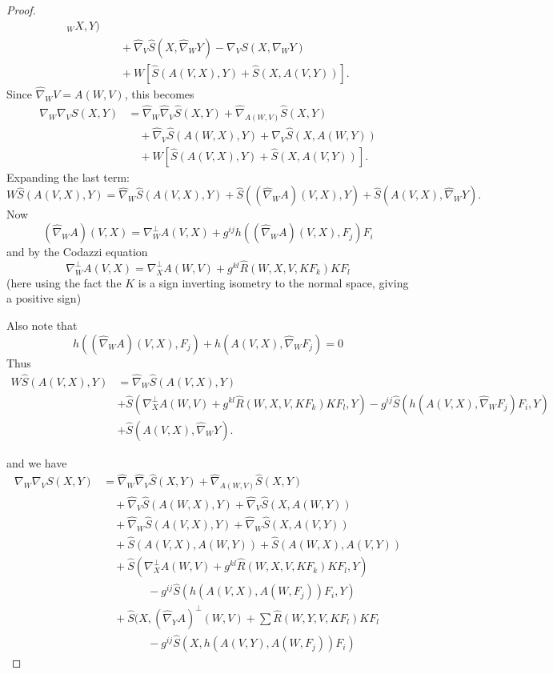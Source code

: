 \documentclass[12pt,letterpaper]{amsart}%
\numberwithin{mycounter}{section}
\theoremstyle{plain}
\numberwithin{equation}{section}
\theoremstyle{definition}
\begin{document}
\begin{proof}
\begin{align*}
_{W}X,Y)\\
&  \quad+\hat{\nabla}_{V}\hat{S}(X,\hat{\nabla}_{W}Y)-\nabla_{V}S(X,\nabla
_{W}Y)\\
&  \quad+W\left[  \hat{S}(A(V,X),Y)+\hat{S}(X,A(V,Y))\right]  .
\end{align*}
Since $\hat{\nabla}_{W}V=A(W,V)$, this becomes
\begin{align*}
\nabla_{W}\nabla_{V}S(X,Y) &  =\hat{\nabla}_{W}\hat{\nabla}_{V}\hat
{S}(X,Y)+\hat{\nabla}_{A(W,V)}\hat{S}(X,Y)\\
&  \quad+\hat{\nabla}_{V}\hat{S}(A(W,X),Y)+\hat{\nabla}_{V}\hat{S}(X,A(W,Y))\\
&  \quad+W\left[  \hat{S}(A(V,X),Y)+\hat{S}(X,A(V,Y))\right]  .
\end{align*}
Expanding the last term:
\[
W\hat{S}(A(V,X),Y)=\hat{\nabla}_{W}\hat{S}(A(V,X),Y)+\hat{S}\left(  \left(
\hat{\nabla}_{W}A\right)  (V,X),Y\right)  +\hat{S}(A(V,X),\hat{\nabla}_{W}Y).
\]
Now
\[
\left(  \hat{\nabla}_{W}A\right)  (V,X)=\nabla_{W}^{\perp}A(V,X)+g^{ij}%
h\left(  (\hat{\nabla}_{W}A)(V,X),F_{j}\right)  F_{i}%
\]
and by the Codazzi equation
\[
\nabla_{W}^{\perp}A(V,X)=\nabla_{X}^{\perp}A(W,V)+g^{kl}\hat{R}(W,X,V,KF_{k}%
)KF_{l}%
\]
(here using the fact the $K$ is a sign inverting isometry to the normal space,
giving a positive sign)\ 

Also note that
\[
h\left(  (\hat{\nabla}_{W}A)(V,X),F_{j}\right)  +h\left(  A(V,X),\hat{\nabla
}_{W}F_{j}\right)  =0
\]
Thus
\begin{align*}
W\hat{S}(A(V,X),Y)  & =\hat{\nabla}_{W}\hat{S}(A(V,X),Y)\\
& +\hat{S}\left(  \nabla_{X}^{\perp}A(W,V)+g^{kl}\hat{R}(W,X,V,KF_{k}%
)KF_{l},Y\right)  -g^{ij}\hat{S}\left(  h\left(  A(V,X),\hat{\nabla}_{W}%
F_{j}\right)  F_{i},Y\right)  \\
& +\hat{S}(A(V,X),\hat{\nabla}_{W}Y).
\end{align*}


and we have
\begin{align*}
\nabla_{W}\nabla_{V}S(X,Y) &  =\hat{\nabla}_{W}\hat{\nabla}_{V}\hat
{S}(X,Y)+\hat{\nabla}_{A(W,V)}\hat{S}(X,Y)\\
&  \quad+\hat{\nabla}_{V}\hat{S}(A(W,X),Y)+\hat{\nabla}_{V}\hat{S}(X,A(W,Y))\\
&  \quad+\hat{\nabla}_{W}\hat{S}(A(V,X),Y)+\hat{\nabla}_{W}\hat{S}(X,A(V,Y))\\
&  \quad+\hat{S}(A(V,X),A(W,Y))+\hat{S}(A(W,X),A(V,Y))\\
&  \quad+\hat{S}\left(  \nabla_{X}^{\perp}A(W,V)+g^{kl}\hat{R}(W,X,V,KF_{k}%
)KF_{l},Y\right)  \\
&  \qquad\qquad-g^{ij}\hat{S}\left(  h\left(  A(V,X),A(W,F_{j})\right)
F_{i},Y\right)  \\
&  \quad+\hat{S}\!\Big(X,\left(  \hat{\nabla}_{Y}A\right)  ^{\perp}%
(W,V)+\sum\hat{R}(W,Y,V,KF_{l})KF_{l}\\
&  \qquad\qquad-g^{ij}\hat{S}\left(  X,h\left(  A(V,Y),A(W,F_{j})\right)
F_{i}\right)
\end{align*}



\end{proof}
\end{document}
